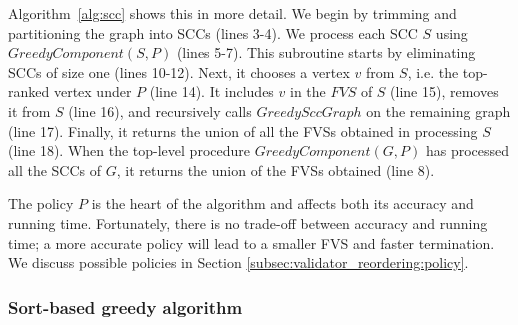 Algorithm~\ref{alg:scc} shows this in more detail. We begin by trimming and partitioning the graph into SCCs  (lines 3-4). We process each SCC $S$ using $GreedyComponent(S, P)$ (lines 5-7). This subroutine starts by eliminating SCCs of size one (lines 10-12). Next, it chooses a vertex $v$ from $S$, i.e. the top-ranked vertex under $P$ (line 14). It includes $v$ in the $FVS$ of $S$ (line 15), removes it from $S$ (line 16), and recursively calls $GreedySccGraph$ on the remaining graph (line 17). Finally, it returns the union of all the FVSs obtained in processing $S$ (line 18). When the top-level procedure $GreedyComponent(G, P)$ has processed all the SCCs of $G$, it returns the union of the FVSs obtained (line 8).

The policy $P$ is the heart of the algorithm and affects both its accuracy and running time. Fortunately, there is no trade-off between accuracy and running time; a more accurate policy will lead to a smaller FVS and faster termination. We discuss possible policies in Section \ref{subsec:validator_reordering:policy}.

\subsubsection{Sort-based greedy algorithm}

